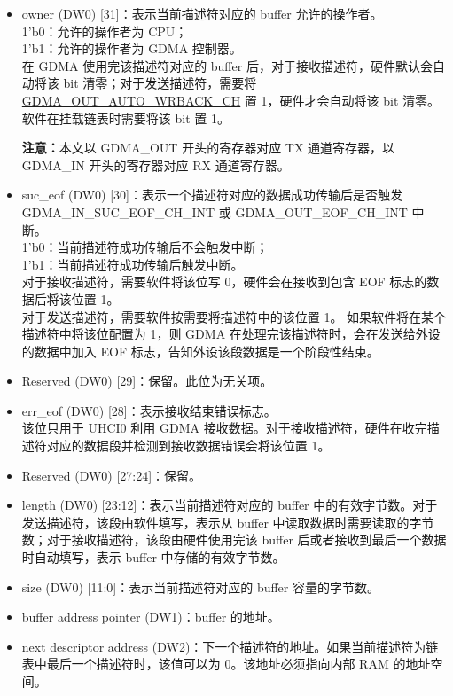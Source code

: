 \documentclass[main\_\_CN.tex]{subfiles}
\begin{document}
\begin{itemize}
    \item owner (DW0) [31]：表示当前描述符对应的 buffer 允许的操作者。\\
    1'b0：允许的操作者为 CPU；\\
    1'b1：允许的操作者为 GDMA 控制器。\\
    在 GDMA 使用完该描述符对应的 buffer 后，对于接收描述符，硬件默认会自动将该 bit 清零；对于发送描述符，需要将 \hyperref[fielddesc:DMAOUTAUTOWRBACKCHN]{GDMA\_OUT\_AUTO\_WRBACK\_CH} 置 1，硬件才会自动将该 bit 清零。软件在挂载链表时需要将该 bit 置 1。

    {\bfseries 注意：}本文以 GDMA\_OUT 开头的寄存器对应 TX 通道寄存器，以 GDMA\_IN 开头的寄存器对应 RX 通道寄存器。
    \item suc\_eof (DW0) [30]：表示一个描述符对应的数据成功传输后是否触发 GDMA\_IN\_SUC\_EOF\_CH\_INT 或 GDMA\_OUT\_EOF\_CH\_INT 中断。\\
    1'b0：当前描述符成功传输后不会触发中断；\\
    1'b1：当前描述符成功传输后触发中断。\\
    对于接收描述符，需要软件将该位写 0，硬件会在接收到包含 EOF 标志的数据后将该位置 1。\\对于发送描述符，需要软件按需要将描述符中的该位置 1。
    如果软件将在某个描述符中将该位配置为 1，则 GDMA 在处理完该描述符时，会在发送给外设的数据中加入 EOF 标志，告知外设该段数据是一个阶段性结束。
    \item Reserved (DW0) [29]：保留。此位为无关项。
    \item err\_eof (DW0) [28]：表示接收结束错误标志。\\
    该位只用于 UHCI0 利用 GDMA 接收数据。对于接收描述符，硬件在收完描述符对应的数据段并检测到接收数据错误会将该位置 1。
    \item Reserved (DW0) [27:24]：保留。
    \item length (DW0) [23:12]：表示当前描述符对应的 buffer 中的有效字节数。对于发送描述符，该段由软件填写，表示从 buffer 中读取数据时需要读取的字节数；对于接收描述符，该段由硬件使用完该 buffer 后或者接收到最后一个数据时自动填写，表示 buffer 中存储的有效字节数。
    \item size (DW0) [11:0]：表示当前描述符对应的 buffer 容量的字节数。
    \item buffer address pointer (DW1)：buffer 的地址。
    \item next descriptor address (DW2)：下一个描述符的地址。如果当前描述符为链表中最后一个描述符时，该值可以为 0。该地址必须指向内部 RAM 的地址空间。
\end{itemize}
\end{document}
